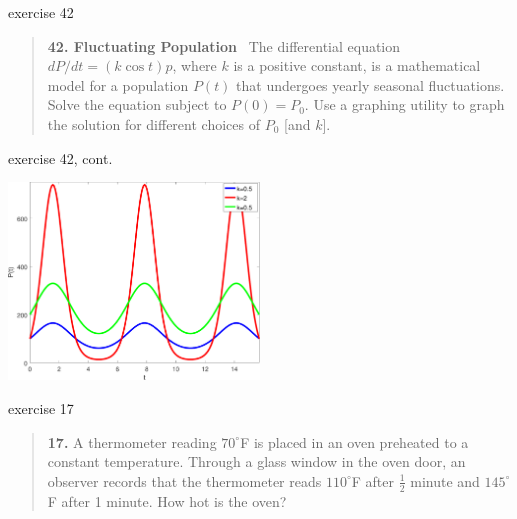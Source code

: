 \documentclass{beamer}
\begin{document}
\begin{frame}{exercise 42}

\small
\begin{quotation}
\noindent \textbf{42.  Fluctuating Population} \, The differential equation $dP/dt = (k \cos t) p$, where $k$ is a positive constant, is a mathematical model for a population $P(t)$ that undergoes yearly seasonal fluctuations.  Solve the equation subject to $P(0)=P_0$.  Use a graphing utility to graph the solution for different choices of $P_0$ [and $k$]. 
\end{quotation}

\vspace{45mm}
\end{frame}


\begin{frame}{exercise 42, cont.}

\vspace{30mm}

\hfill \includegraphics[width=0.5\textwidth]{figs/exercise-42-3-1}
\end{frame}


\begin{frame}{exercise 17}

\small
\begin{quotation}
\noindent \textbf{17.} A thermometer reading $70^\circ$F is placed in an oven preheated to a constant temperature.  Through a glass window in the oven door, an observer records that the thermometer reads $110^\circ$F after $\frac{1}{2}$ minute and $145^\circ$F after 1 minute.  How hot is the oven?
\end{quotation}

\vspace{50mm}
\end{frame}
\end{document}
